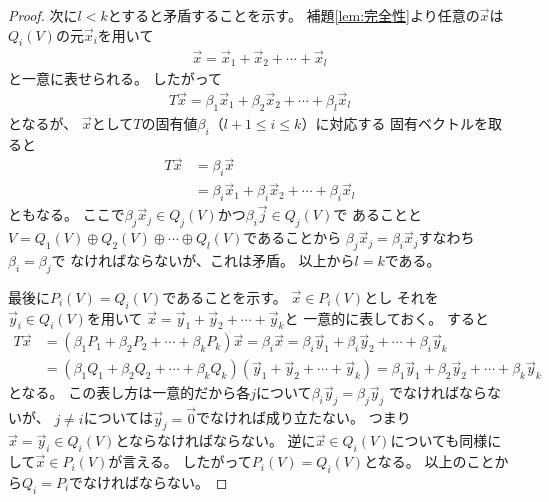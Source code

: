 \documentclass[a4paper, 10pt]{jsarticle}
\begin{document}
\begin{proof}
	次に$l < k$とすると矛盾することを示す。
	補題\ref{lem:完全性}より任意の$\vec{x}$は
	$Q_i(V)$の元$\vec{x}_i$を用いて
	\begin{align}
		\vec{x} = \vec{x}_1 + \vec{x}_2 + \cdots + \vec{x}_l
	\end{align}
	と一意に表せられる。
	したがって
	\begin{align}
		T \vec{x}
		= \beta_1 \vec{x}_1 + \beta_2 \vec{x}_2 + \cdots + \beta_l \vec{x}_l
	\end{align}
	となるが、
	$\vec{x}$として$T$の固有値$\beta_i$（$l+1 \leq i \leq k$）に対応する
	固有ベクトルを取ると
	\begin{align}
		T \vec{x}
		&= \beta_i \vec{x} \\
		&= \beta_i \vec{x}_1 + \beta_i \vec{x}_2 + \cdots + \beta_i \vec{x}_l
	\end{align}
	ともなる。
	ここで$\beta_j \vec{x}_j \in Q_j(V)$かつ$\beta_i \vec{j} \in Q_j(V)$で
	あることと
	$V = Q_1(V) \oplus Q_2(V) \oplus \cdots \oplus Q_l(V)$であることから
	$\beta_j \vec{x}_j = \beta_i \vec{x}_j$すなわち$\beta_i = \beta_j$で
	なければならないが、これは矛盾。
	以上から$l = k$である。

	最後に$P_i(V) = Q_i(V)$であることを示す。
	$\vec{x} \in P_i(V)$とし
	それを$\vec{y}_i \in Q_i(V)$を用いて
	$\vec{x} = \vec{y}_1 + \vec{y}_2 + \cdots + \vec{y}_k$と
	一意的に表しておく。
	すると
	\begin{align}
		T \vec{x}
		&= \left( \beta_1 P_1 + \beta_2 P_2 + \cdots + \beta_k P_k \right)
		\vec{x}
		= \beta_i \vec{x}
		= \beta_i \vec{y}_1 + \beta_i \vec{y}_2 + \cdots + \beta_i \vec{y}_k \\
		&= \left( \beta_1 Q_1 + \beta_2 Q_2 + \cdots + \beta_k Q_k \right)
		\left( \vec{y}_1 + \vec{y}_2 + \cdots + \vec{y}_k \right)
		= \beta_1 \vec{y}_1 + \beta_2 \vec{y}_2 + \cdots + \beta_k \vec{y}_k
	\end{align}
	となる。
	この表し方は一意的だから各$j$について$\beta_i \vec{y}_j = \beta_j \vec{y}_j$
	でなければならないが、
	$j \neq i$については$\vec{y}_j = \vec{0}$でなければ成り立たない。
	つまり$\vec{x} = \vec{y}_i \in Q_i(V)$とならなければならない。
	逆に$\vec{x} \in Q_i(V)$についても同様にして$\vec{x} \in P_i(V)$が言える。
	したがって$P_i(V) = Q_i(V)$となる。
	以上のことから$Q_i = P_i$でなければならない。
\end{proof}
\end{document}
